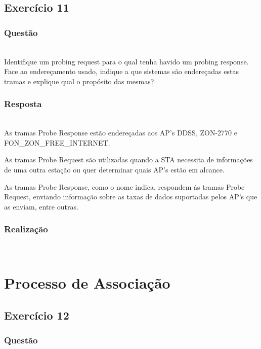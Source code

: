 \documentclass{llncs}
\begin{document}
\clearpage
\subsection{Exercício 11}
\subsubsection{Questão}\rule[-10pt]{0pt}{10pt}\\

Identifique um probing request para o qual tenha havido um probing response. Face ao endereçamento usado, indique a que sistemas são endereçadas estas tramas e explique qual o propósito das mesmas?

\subsubsection{Resposta}\rule[-10pt]{0pt}{10pt}\\

As tramas Probe Response estão endereçadas aos AP's DDSS, ZON-2770 e FON_ZON_FREE_INTERNET. 
\par As tramas Probe Request são utilizadas quando a STA necessita de informações de uma outra estação ou quer determinar quais AP's estão em alcance. 
\par As tramas Probe Response, como o nome indica, respondem às tramas Probe Request, enviando informação sobre as taxas de dados suportadas pelos AP's que as enviam, entre outras.

\subsubsection{Realização}\rule[-10pt]{0pt}{10pt}\\



\clearpage

\section{Processo de Associação}
\subsection{Exercício 12}
\subsubsection{Questão}\rule[-10pt]{0pt}{10pt}\\
\end{document}
